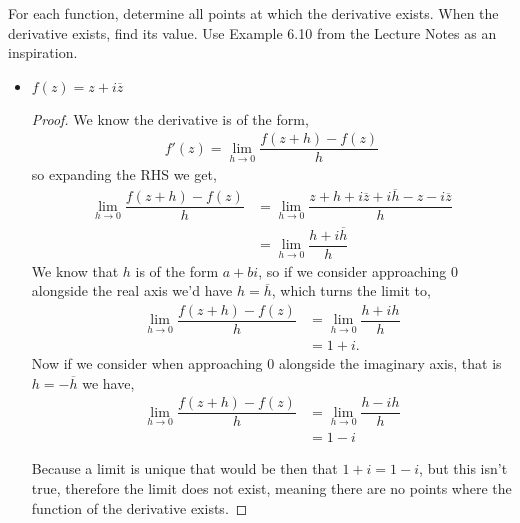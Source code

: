 \documentclass[11pt]{article}
\newenvironment{problem}[2][Problem\!]{\begin{trivlist}
\item[\hskip \labelsep {\bfseries #1}\hskip \labelsep {\bfseries #2}]}{\end{trivlist}}
\begin{document}
\newpage  %

\begin{problem}{3.5}
For each function, determine all points at which the derivative exists. When the derivative exists, find its value. Use Example 6.10 from the Lecture Notes as an inspiration.
\begin{itemize}[itemsep=3em]
\item[(a)] $f(z) = z + i\overline{z}$
\begin{proof}
  We know the derivative is of the form,
  \begin{align*}
    f'(z) = \lim_{h \to 0} \dfrac{f(z+ h) - f(z)}{h} 
  \end{align*}
  so expanding the RHS we get,
  \begin{align*}
    \lim_{h \to 0} \dfrac{f(z+ h) - f(z)}{h}  &= \lim_{h \to 0}\dfrac{z+h +i\overline{z} + i\overline{h} -z -i\overline{z} }{h} \\
    &= \lim_{h \to 0}\dfrac{h +i\overline{h}}{h}
  \end{align*}
  We know that $h$ is of the form $a + bi$, so if we consider approaching 0 alongside the real axis we'd have $ h = \overline{h}$, which turns the limit to,
  \begin{align*}
    \lim_{h \to 0} \dfrac{f(z+ h) - f(z)}{h} &= \lim_{h \to 0}\dfrac{h + ih}{h} \\
    &= 1 + i.
  \end{align*}
  Now if we consider when approaching 0 alongside the imaginary axis, that is $ h = -\overline{h}$ we have,
  \begin{align*}
    \lim_{h \to 0} \dfrac{f(z+ h) - f(z)}{h} &= \lim_{h \to 0}\dfrac{h - ih}{h} \\
    &= 1-i
  \end{align*}

  Because a limit is unique that would be then that $1 + i = 1-i$, but this isn't true, therefore the limit does not exist, meaning there are no points where the function of the derivative exists. 

\end{proof}


\end{itemize}
\end{problem}
\end{document}

